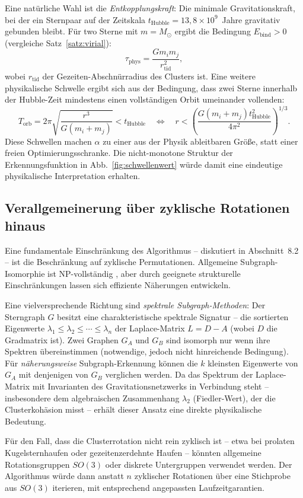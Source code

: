 ﻿\documentclass[a4paper,12pt]{report}
\theoremstyle{definition}
\begin{document}
Eine natürliche Wahl ist die \emph{Entkopplungskraft}: Die minimale Gravitationskraft, bei der ein Sternpaar auf der Zeitskala $t_\mathrm{Hubble} = 13{,}8 \times 10^9$~Jahre gravitativ gebunden bleibt. Für two Sterne mit $m = M_\odot$ ergibt die Bedingung $E_\mathrm{bind} > 0$ (vergleiche Satz~\ref{satz:virial}):
\[
\tau_\mathrm{phys} = \frac{G m_i m_j}{r_\mathrm{tid}^2},
\]
wobei $r_\mathrm{tid}$ der Gezeiten-Abschnürradius des Clusters ist. Eine weitere physikalische Schwelle ergibt sich aus der Bedingung, dass zwei Sterne innerhalb der Hubble-Zeit mindestens einen vollständigen Orbit umeinander vollenden:
\[
T_\mathrm{orb} = 2\pi \sqrt{\frac{r^3}{G(m_i + m_j)}} < t_\mathrm{Hubble} \quad \Longleftrightarrow \quad r < \left(\frac{G(m_i+m_j) t_\mathrm{Hubble}^2}{4\pi^2}\right)^{1/3}.
\]
Diese Schwellen machen $\alpha$ zu einer aus der Physik ableitbaren Größe, statt einer freien Optimierungsschranke. Die nicht-monotone Struktur der Erkennungsfunktion in Abb.~\ref{fig:schwellenwert} würde damit eine eindeutige physikalische Interpretation erhalten.

\subsection{Verallgemeinerung über zyklische Rotationen hinaus}

Eine fundamentale Einschränkung des Algorithmus -- diskutiert in Abschnitt~8.2 -- ist die Beschränkung auf zyklische Permutationen. Allgemeine Subgraph-Isomorphie ist NP-vollständig \cite{cook1971}, aber durch geeignete strukturelle Einschränkungen lassen sich effiziente Näherungen entwickeln.

Eine vielversprechende Richtung sind \emph{spektrale Subgraph-Methoden}: Der Sterngraph $G$ besitzt eine charakteristische spektrale Signatur -- die sortierten Eigenwerte $\lambda_1 \leq \lambda_2 \leq \cdots \leq \lambda_n$ der Laplace-Matrix $L = D - A$ (wobei $D$ die Gradmatrix ist). Zwei Graphen $G_A$ und $G_B$ sind isomorph nur wenn ihre Spektren übereinstimmen (notwendige, jedoch nicht hinreichende Bedingung). Für \emph{näherungsweise} Subgraph-Erkennung können die $k$ kleinsten Eigenwerte von $G_A$ mit denjenigen von $G_B$ verglichen werden. Da das Spektrum der Laplace-Matrix mit Invarianten des Gravitationsnetzwerks in Verbindung steht -- insbesondere dem algebraischen Zusammenhang $\lambda_2$ (Fiedler-Wert), der die Clusterkohäsion misst -- erhält dieser Ansatz eine direkte physikalische Bedeutung.

Für den Fall, dass die Clusterrotation nicht rein zyklisch ist -- etwa bei prolaten Kugelsternhaufen oder gezeitenzerdehnte Haufen -- könnten allgemeine Rotationsgruppen $SO(3)$ oder diskrete Untergruppen verwendet werden. Der Algorithmus würde dann anstatt $n$ zyklischer Rotationen über eine Stichprobe aus $SO(3)$ iterieren, mit entsprechend angepassten Laufzeitgarantien.
\end{document}

